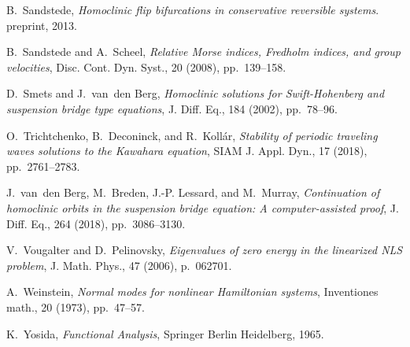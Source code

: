 \documentclass[review,onefignum,onetabnum]{siamart171218}
\begin{document}
\begin{thebibliography}{10}
{\sc B.~Sandstede}, {\em Homoclinic flip bifurcations in conservative
  reversible systems}.
\newblock preprint, 2013.

{\sc B.~Sandstede and A.~Scheel}, {\em Relative {M}orse indices, {F}redholm
  indices, and group velocities}, Disc. Cont. Dyn. Syst., 20 (2008),
  pp.~139--158.

{\sc D.~Smets and J.~van~den Berg}, {\em Homoclinic solutions for
  {S}wift-{H}ohenberg and suspension bridge type equations}, J. Diff. Eq., 184
  (2002), pp.~78--96.

{\sc O.~Trichtchenko, B.~Deconinck, and R.~Koll\'ar}, {\em Stability of
  periodic traveling waves solutions to the {K}awahara equation}, SIAM J. Appl.
  Dyn., 17 (2018), pp.~2761--2783.

{\sc J.~van~den Berg, M.~Breden, J.-P. Lessard, and M.~Murray}, {\em
  Continuation of homoclinic orbits in the suspension bridge equation: A
  computer-assisted proof}, J. Diff. Eq., 264 (2018), pp.~3086--3130.

{\sc V.~Vougalter and D.~Pelinovsky}, {\em Eigenvalues of zero energy in the
  linearized {NLS} problem}, J. Math. Phys., 47 (2006), p.~062701.

{\sc A.~Weinstein}, {\em Normal modes for nonlinear {H}amiltonian systems},
  Inventiones math., 20 (1973), pp.~47--57.
  
{\sc K.~Yosida}, {\em Functional Analysis}, Springer Berlin Heidelberg, 1965.

\end{thebibliography}

\end{document}
